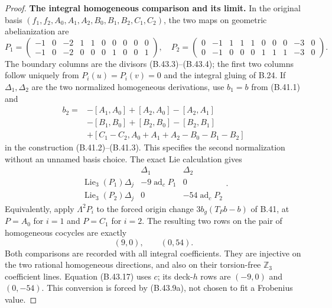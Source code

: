 \begin{proof}
\par\smallskip\noindent\textbf{The integral homogeneous comparison and its limit.}
In the original basis $(f_1,f_2,A_0,A_1,A_2,B_0,B_1,B_2,C_1,C_2)$,
the two maps on geometric abelianization are
\[
 P_1=\begin{pmatrix}
 -1&0&-2&1&1&0&0&0&0&0\\
 -1&0&-2&0&0&0&1&0&0&1
 \end{pmatrix},\quad
 P_2=\begin{pmatrix}
 0&-1&1&1&1&0&0&0&-3&0\\
 0&-1&0&0&0&1&1&1&-3&0
 \end{pmatrix}.                                             \tag{B.43.15}
\]
The boundary columns are the divisors (B.43.3)--(B.43.4);
the first two columns follow uniquely from
$P_i(u)=P_i(v)=0$ and the integral gluing of B.24.
If $\Delta_1,\Delta_2$ are the two normalized homogeneous
derivations, use $b_1=b$ from (B.41.1) and
\[
 \begin{split}
 b_2={}&-[A_1,A_0]+[A_2,A_0]-[A_2,A_1]\\
       &-[B_1,B_0]+[B_2,B_0]-[B_2,B_1]\\
       &+[C_1-C_2,A_0+A_1+A_2-B_0-B_1-B_2]
 \end{split}
\]
in the construction (B.41.2)--(B.41.3).  This specifies
the second normalization without an unnamed basis choice.
The exact Lie calculation gives
\[
 \begin{array}{c|cc}
 &\Delta_1&\Delta_2\\\hline
 \operatorname{Lie}_3(P_1)\Delta_j&-9\operatorname{ad}_c P_1&0\\
 \operatorname{Lie}_3(P_2)\Delta_j&0&-54\operatorname{ad}_c P_2
 \end{array}.                                               \tag{B.43.16}
\]
Equivalently, apply $\Lambda^2P_i$ to the forced origin
change $3b_g(T_Pb-b)$ of B.41, at $P=A_0$ for $i=1$ and
$P=C_1$ for $i=2$.  The resulting two rows on the pair
of homogeneous cocycles are exactly
\[
                  (9,0),\qquad(0,54).                       \tag{B.43.17}
\]
Both comparisons are recorded with all integral coefficients.
They are injective on the two rational homogeneous directions,
and also on their torsion-free $\mathbb Z_3$ coefficient lines.
Equation (B.43.17) uses $c$; its deck-$h$ rows are $(-9,0)$
and $(0,-54)$. This conversion is forced by (B.43.9a),
not chosen to fit a Frobenius value.


\end{proof}
